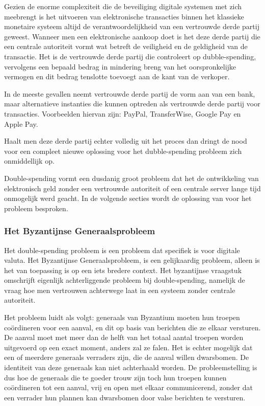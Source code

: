 			Gezien de enorme complexiteit die de beveiliging digitale systemen met zich meebrengt is het uitvoeren van elektronische transacties binnen het klassieke monetaire systeem altijd de verantwoordelijkheid van een vertrouwde derde partij geweest. Wanneer men een elektronische aankoop doet is het deze derde partij die een centrale autoriteit vormt wat betreft de veiligheid en de geldigheid van de transactie. Het is de vertrouwde derde partij die controleert op dubble-spending, vervolgens een bepaald bedrag in mindering breng van het oorspronkelijke vermogen en dit bedrag tenslotte toevoegt aan de kant van de verkoper. 
			
			In de meeste gevallen neemt vertrouwde derde partij de vorm aan van een bank, maar alternatieve instanties die kunnen optreden als vertrouwde derde partij voor transacties. Voorbeelden hiervan zijn: PayPal, TransferWise, Google Pay en Apple Pay.
		
			Haalt men deze derde partij echter volledig uit het proces dan dringt de nood voor een compleet nieuwe oplossing voor het dubble-spending probleem zich onmiddellijk op.
			
			Double-spending vormt een dusdanig groot probleem dat het de ontwikkeling van elektronisch geld zonder een vertrouwde autoriteit of een centrale server lange tijd onmogelijk werd geacht. In de volgende secties wordt de oplossing van \textcite{Nakamoto2008} voor het probleem besproken. 
			
			\subsubsection{Het Byzantijnse Generaalsprobleem}
			Het double-spending probleem is een probleem dat specifiek is voor digitale valuta. Het Byzantijnse Generaalsprobleem, is een gelijkaardig probleem, alleen is het van toepassing is op een iets bredere context. Het byzantijnse vraagstuk omschrijft eigenlijk achterliggende probleem bij double-spending, namelijk de vraag hoe men vertrouwen achterwege laat in een systeem zonder centrale autoriteit.
			
			Het probleem luidt als volgt: generaals van Byzantium moeten hun troepen coördineren voor een aanval, en dit op basis van berichten die ze elkaar versturen. De aanval moet met meer dan de helft van het totaal aantal troepen worden uitgevoerd op een exact moment, anders zal ze falen. Het is echter mogelijk dat een of meerdere generaals verraders zijn, die de aanval willen dwarsbomen. De identiteit van deze generaals kan niet achterhaald worden. De probleemstelling is dus hoe de generaals die te goeder trouw zijn toch hun troepen kunnen coördineren tot een aanval, vrij en open met elkaar communicerend, zonder dat een verrader hun plannen kan dwarsbomen door valse berichten te versturen.
			
